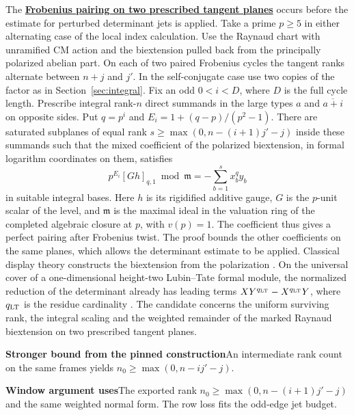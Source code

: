 \documentclass[11pt,a4paper]{article}
\newcommand{\rhscopelabel}[2]{%
  {\setlength{\fboxsep}{2pt}\colorbox{#1}{%
    \small\sffamily\bfseries\color{PageInk}#2}}}
\newcommand{\rhrange}[3][Stronger result in the original Lean release]{%
  \par\addvspace{.45\baselineskip}\Needspace{4\baselineskip}%
  \begingroup\setlength{\leftskip}{.65em}\setlength{\parindent}{0pt}%
  \noindent\rhscopelabel{TraceTint}{#1}\enspace#2\par
  \nobreak\smallskip
  \noindent\rhscopelabel{FieldTint}{Window argument uses}\enspace#3\par
  \endgroup\addvspace{.45\baselineskip}}
\begin{document}
The \textbf{\hyperlink{candidate.marked-frobenius-pairing}{Frobenius pairing on
two prescribed tangent planes}} occurs before the estimate for perturbed determinant jets is applied.
Take a prime \(p\ge5\) in either alternating case of the local
index calculation. Use the Raynaud chart with unramified CM action
and the biextension pulled back from the principally polarized abelian part.
On each of two paired Frobenius cycles the tangent ranks alternate
between \(n+j\) and \(j'\). In the self-conjugate case use two
copies of the factor as in Section~\ref{sec:integral}.
Fix an odd \(0<i<D\), where \(D\) is the full cycle length.
Prescribe integral rank-\(n\) direct summands in the large types
\(a\) and \(\overline{a+i}\) on opposite sides. Put \(q=p^i\) and
\(E_i=1+(q-p)/(p^2-1)\). There are saturated subplanes of equal
rank \(s\ge\max(0,n-(i+1)j'-j)\) inside these summands such that the
mixed coefficient of the polarized biextension, in formal
logarithm coordinates on them, satisfies
\[
 p^{E_i}[Gh]_{q,1}\bmod\mathfrak m
      =-\sum_{b=1}^s x_b^q y_b
\]
in suitable integral bases. Here \(h\) is its rigidified additive
gauge, \(G\) is the \(p\)-unit scalar of the level, and \(\mathfrak m\)
is the maximal ideal in the valuation ring of the completed
algebraic closure at \(p\), with \(v(p)=1\).
The coefficient thus gives a perfect pairing after Frobenius
twist. The proof bounds the other coefficients on the same
planes, which allows the determinant estimate to be applied.
Classical display theory constructs the biextension from the
polarization \cite[\S4.3]{cartier-display}. On the universal cover
of a one-dimensional height-two Lubin--Tate formal module, the
normalized reduction of the determinant already has leading terms
\(XY^{q_{\rm LT}}-X^{q_{\rm LT}}Y\), where \(q_{\rm LT}\) is the
residue cardinality \cite[Proposition~5.3.1]{weinstein-semstable-models}.
The candidate concerns the uniform surviving rank, the integral
scaling and the weighted remainder of the marked Raynaud biextension
on two prescribed tangent planes.
\rhrange[Stronger bound from the pinned construction]{An intermediate
rank count on the same frames yields \(n_0\ge\max(0,n-ij'-j)\).}
{The exported rank \(n_0\ge\max(0,n-(i+1)j'-j)\) and the same weighted
normal form. The row loss fits the odd-edge jet budget.}
\end{document}
